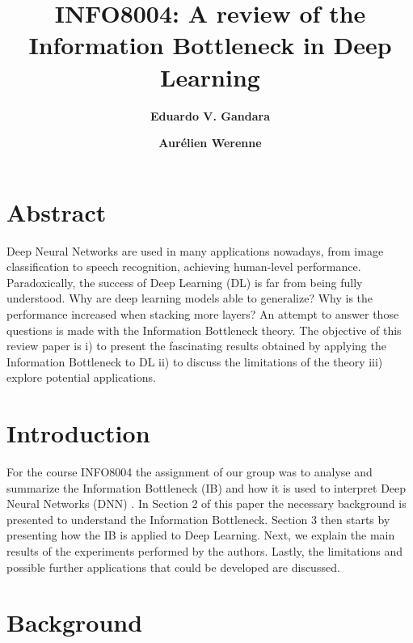 \documentclass[twocolumn,superscriptaddress,aps]{revtex4-1}
\begin{document}

\title{\Large{INFO8004: A review of the Information Bottleneck in Deep Learning}}
\vspace{1cm}
\author{\small{\bf Eduardo V. Gandara}}
\author{\small{\bf Aurélien Werenne}}

\maketitle


\section*{Abstract}

Deep Neural Networks are used in many applications nowadays, from image classification to speech recognition, achieving human-level performance. Paradoxically, the success of Deep Learning (DL) is far from being fully understood. Why are deep learning models able to generalize? Why is the performance increased when stacking more layers? An attempt to answer those questions is made with the Information Bottleneck theory. The objective of this review paper is i) to present the fascinating results obtained by applying the Information Bottleneck to DL ii) to discuss the limitations of the theory iii) explore potential applications. 


\section{Introduction}

For the course INFO8004 the assignment of our group was to analyse and summarize the Information Bottleneck (IB) and how it is used to interpret Deep Neural Networks (DNN) \citep{Tishby2, Tishby3}. In Section 2 of this paper the necessary background is presented to understand the Information Bottleneck. Section 3 then starts by presenting how the IB is applied to Deep Learning. Next, we explain the main results of the experiments performed by the authors. Lastly, the limitations and possible further applications that could be developed are discussed.


\section{Background}\label{sec:background}
\end{document}
